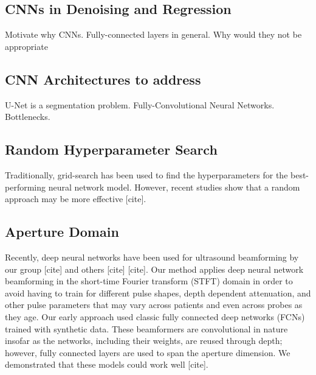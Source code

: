 \subsection{CNNs in Denoising and Regression}
Motivate why CNNs. Fully-connected layers in general. Why would they not be appropriate

\subsection{CNN Architectures to address}
U-Net is a segmentation problem. Fully-Convolutional Neural Networks. Bottlenecks.


\subsection{Random Hyperparameter Search}


Traditionally, grid-search has been used to find the hyperparameters for the best-performing neural network model. However, recent studies show that a random approach may be more effective [cite].




\subsection{Aperture Domain}

Recently, deep neural networks have been used for ultrasound beamforming by our group [cite] and others [cite] [cite]. Our method applies deep neural network beamforming in the short-time Fourier transform (STFT) domain in order to avoid having to train for different pulse shapes, depth dependent attenuation, and other pulse parameters that may vary across patients and even across probes as they age. Our early approach used classic fully connected deep networks (FCNs) trained with synthetic data. These beamformers are convolutional in nature insofar as the networks, including their weights, are reused through depth; however, fully connected layers are used to span the aperture dimension. We demonstrated that these models could work well [cite].
